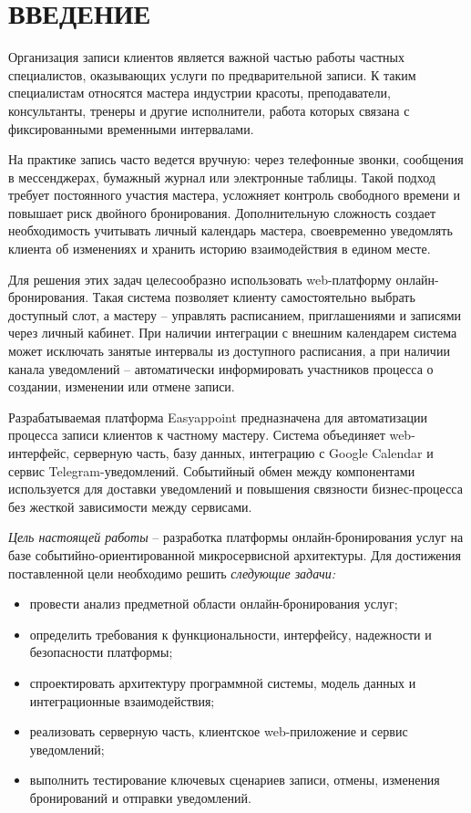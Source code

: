 \section*{ВВЕДЕНИЕ}

Организация записи клиентов является важной частью работы частных специалистов, оказывающих услуги по предварительной записи. К таким специалистам относятся мастера индустрии красоты, преподаватели, консультанты, тренеры и другие исполнители, работа которых связана с фиксированными временными интервалами.

На практике запись часто ведется вручную: через телефонные звонки, сообщения в мессенджерах, бумажный журнал или электронные таблицы. Такой подход требует постоянного участия мастера, усложняет контроль свободного времени и повышает риск двойного бронирования. Дополнительную сложность создает необходимость учитывать личный календарь мастера, своевременно уведомлять клиента об изменениях и хранить историю взаимодействия в едином месте.

Для решения этих задач целесообразно использовать web-платформу онлайн-бронирования. Такая система позволяет клиенту самостоятельно выбрать доступный слот, а мастеру -- управлять расписанием, приглашениями и записями через личный кабинет. При наличии интеграции с внешним календарем система может исключать занятые интервалы из доступного расписания, а при наличии канала уведомлений -- автоматически информировать участников процесса о создании, изменении или отмене записи.

Разрабатываемая платформа Easyappoint предназначена для автоматизации процесса записи клиентов к частному мастеру. Система объединяет web-интерфейс, серверную часть, базу данных, интеграцию с Google Calendar и сервис Telegram-уведомлений. Событийный обмен между компонентами используется для доставки уведомлений и повышения связности бизнес-процесса без жесткой зависимости между сервисами.

\emph{Цель настоящей работы} -- разработка платформы онлайн-бронирования услуг на базе событийно-ориентированной микросервисной архитектуры. Для достижения поставленной цели необходимо решить \emph{следующие задачи:}
\begin{itemize}
\item провести анализ предметной области онлайн-бронирования услуг;
\item определить требования к функциональности, интерфейсу, надежности и безопасности платформы;
\item спроектировать архитектуру программной системы, модель данных и интеграционные взаимодействия;
\item реализовать серверную часть, клиентское web-приложение и сервис уведомлений;
\item выполнить тестирование ключевых сценариев записи, отмены, изменения бронирований и отправки уведомлений.
\end{itemize}

